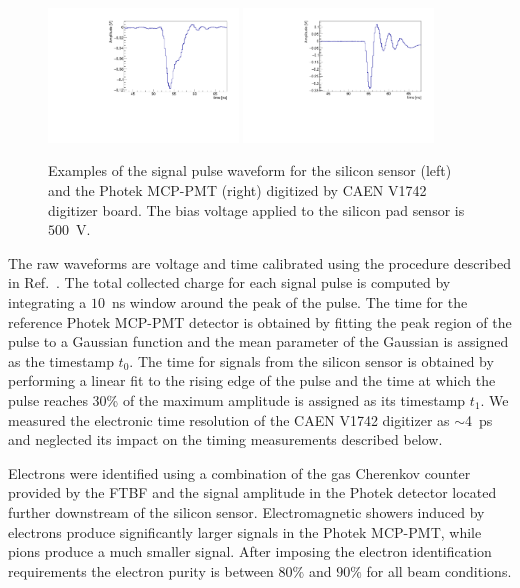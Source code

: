 \documentclass[12pt]{article}
\begin{document}
{\begin{figure}[htbp] 
\centering
\includegraphics[width=0.45\textwidth]{plots/ExampleSiliconPadPulse_6X0_16GeV.pdf} 
\includegraphics[width=0.45\textwidth]{plots/ExamplePhotekPulse.pdf} 
\caption{Examples of the signal pulse waveform for the silicon sensor (left) and
the Photek MCP-PMT (right) digitized by CAEN V1742 digitizer board. The bias
voltage applied to the silicon pad sensor is~$500$~V.} 
\label{fig:pulses} 
\end{figure} 

The raw waveforms are voltage and time calibrated using the  procedure
described in Ref.~\cite{Kim201467}. The total collected charge for each signal
pulse is computed by integrating a $10$~ns window around the peak of the pulse.
The time for the reference Photek MCP-PMT detector is obtained by fitting the
peak region of the pulse to a Gaussian function and the mean parameter of the
Gaussian is assigned as the timestamp $t_0$. The time for signals from the
silicon sensor is obtained by performing a linear fit to the rising edge of the
pulse and the time at which the pulse reaches 30\% of the maximum amplitude is
assigned as its timestamp $t_1$. We measured the electronic time resolution
of the CAEN V1742 digitizer as $\sim$4~ps and neglected its impact on the timing
measurements described below.

Electrons were identified using a combination of the gas Cherenkov counter
provided by the FTBF and the signal amplitude in the Photek detector located further
downstream of the silicon sensor. Electromagnetic showers induced by electrons
produce significantly larger signals in the Photek MCP-PMT, while pions produce
a much smaller signal. After imposing the electron identification 
requirements the electron purity is between $80\%$ and $90\%$ for all beam
conditions. 

}
\end{document}
